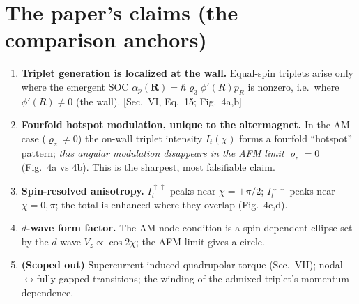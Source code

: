 \documentclass[11pt]{article}
\begin{document}
\section{The paper's claims (the comparison anchors)}
\begin{enumerate}
\item \textbf{Triplet generation is localized at the wall.} Equal-spin triplets
arise only where the emergent SOC $\alpha_p(\mathbf R)=\hbar\varrho_3\phi'(R)p_R$
is nonzero, i.e.\ where $\phi'(R)\neq0$ (the wall). [Sec.~VI, Eq.~15; Fig.~4a,b]
\item \textbf{Fourfold hotspot modulation, unique to the altermagnet.} In the AM
case ($\varrho_z\neq0$) the on-wall triplet intensity $I_t(\chi)$ forms a fourfold
``hotspot'' pattern; \emph{this angular modulation disappears in the AFM limit}
$\varrho_z=0$ (Fig.~4a vs 4b). This is the sharpest, most falsifiable claim.
\item \textbf{Spin-resolved anisotropy.} $I_t^{\uparrow\uparrow}$ peaks near
$\chi=\pm\pi/2$; $I_t^{\downarrow\downarrow}$ peaks near $\chi=0,\pi$; the total is
enhanced where they overlap (Fig.~4c,d).
\item \textbf{$d$-wave form factor.} The AM node condition is a spin-dependent
ellipse set by the $d$-wave $V_z\propto\cos2\chi$; the AFM limit gives a circle.
\item \textbf{(Scoped out)} Supercurrent-induced quadrupolar torque (Sec.~VII);
nodal$\leftrightarrow$fully-gapped transitions; the winding of the admixed
triplet's momentum dependence.
\end{enumerate}
\end{document}
